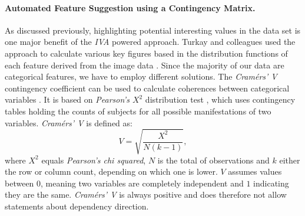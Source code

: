 \documentclass[journal]{style/vgtc} 			          %
\begin{document}
\paragraph{Automated Feature Suggestion using a Contingency Matrix.}
As discussed previously, highlighting potential interesting values in the data set is one major benefit of the \emph{IVA} powered approach.
%
Turkay and colleagues used the approach to calculate various key figures based in the distribution functions of each feature derived from the image data \cite{Turkay2013}.
%
Since the majority of our data are categorical features, we have to employ different solutions.
%
The \emph{Cram\'{e}rs' V} contingency coefficient can be used to calculate coherences between categorical variables \cite{CramerV}.
%
It is based on \emph{Pearson's $X^2$} distribution test \cite{ChiSquare}, which uses contingency tables holding the counts of subjects for all possible manifestations of two variables.
%
\emph{Cram\'{e}rs' V} is defined as:
\begin{equation}
V = \sqrt{\frac{X^2}{N(k-1)}},
\end{equation}
where $X^2$ equals \emph{Pearson's chi squared}, $N$ is the total of observations and $k$ either the row or column count, depending on which one is lower.
%
$V$ assumes values between $0$, meaning two variables are completely independent and $1$ indicating they are the same.
%
\emph{Cram\'{e}rs' V} is always positive and does therefore not allow statements about dependency direction.
\end{document}
